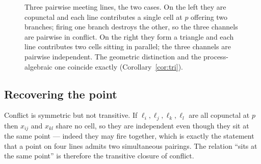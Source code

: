 \documentclass[11pt]{article}
\theoremstyle{plain}
\theoremstyle{definition}
\newcommand{\bmid}{\mathbin{|}}
\begin{document}
\begin{figure}[t]
\centering
{}
\caption{Three pairwise meeting lines, the two cases. On the left they are copunctal and each
line contributes a single cell at $p$ offering two branches; firing one branch destroys the other,
so the three channels are pairwise in conflict. On the right they form a triangle and each line
contributes two cells sitting in parallel; the three channels are pairwise independent. The
geometric distinction and the process-algebraic one coincide exactly
(Corollary~\ref{cor:tri}).}
\label{fig:pencil}
\end{figure}

\subsection{Recovering the point}

Conflict is symmetric but not transitive. If $\ell_i,\ell_j,\ell_k,\ell_l$ are all copunctal at $p$
then $x_{ij}$ and $x_{kl}$ share no cell, so they are independent even though they sit at the same
point --- indeed they may fire together, which is exactly the statement that a point on four lines
admits two simultaneous pairings. The relation ``sits at the same point'' is therefore the
transitive closure of conflict.
\end{document}
